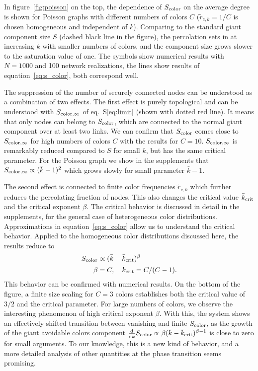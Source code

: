 \documentclass[aps, pre, twocolumn, a4paper, floatfix]{revtex4}
\begin{document}
In figure~\ref{fig:poisson} on the top, the dependence of $S_{\rm color}$ on the average degree is shown for Poisson graphs 
with different numbers of colors $C$ (${\tilde r}_{c,k}=1/C$ is chosen homogeneous and independent of $k$). 
Comparing to the standard giant component size $S$ (dashed black line in the figure), 
the percolation sets in at increasing $\bar k$ with smaller numbers of colors, and the component size grows 
slower to the saturation value of one. The symbols show numerical results with $N=1000$ and 100 network realizations, 
the lines show results of equation~\ref{eq:s_color}, both correspond well. 

The suppression of the number of securely connected nodes can be understood as a combination of two effects. 
The first effect is purely topological and can be understood with $S_{{\rm color},\infty}$ of eq.~S\ref{eq:limit}
(shown with dotted red line). It means that only nodes can belong to $S_{\rm color}$, which are connected 
to the normal giant component over at least two links. We can confirm that 
$S_{\rm color}$ comes close to $S_{{\rm color},\infty}$ for high numbers of colors $C$ with the results for $C=10$.
$S_{{\rm color},\infty}$ is remarkably reduced compared to $S$ for small $k$, but has the same critical parameter. 
For the Poisson graph we show in the supplements that $S_{\rm color,\infty}\propto ({\bar k}-1)^2$ 
which grows slowly for small parameter ${\bar k}-1$. 

The second effect is connected to finite color frequencies ${\tilde r}_{c,k}$ which further reduces the percolating 
fraction of nodes. This also changes the critical value ${\bar k}_{\rm crit}$ and the critical exponent 
$\beta$. The critical behavior is discussed in detail in the supplements, for the general case of heterogeneous color 
distributions. Approximations in equation~\ref{eq:s_color} allow us to understand the critical behavior. 
Applied to the homogeneous color distributions discussed here, the results reduce to 
\begin{align}
S_{\rm color} &\propto ({\bar k}-{\bar k}_{\rm crit})^{\beta}\\
\beta&=C,\quad {\bar k}_{\rm crit} = C/(C-1).
\end{align}
This behavior can be confirmed with numerical results. On the bottom of the figure, a finite size 
scaling for $C=3$ colors establishes both the critical value of $3/2$ and the critical parameter.
For large numbers of colors, we observe the interesting phenomenon of high critical exponent 
$\beta$. With this, the system shows an effectively shifted transition between vanishing and finite $S_{\rm color}$, 
as the growth of the giant avoidable colors component 
$\frac{\rm d}{{\rm d} {\bar k}}S_{\rm color}\propto \beta ({\bar k}-{\bar k}_{\rm crit})^{\beta-1}$ 
is close to zero for small arguments. To our knowledge, this is a new kind of behavior, and a more 
detailed analysis of other quantities at the phase transition seems promising. 
\end{document}
